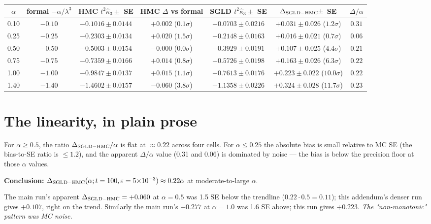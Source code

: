 \documentclass[11pt]{article}
\begin{document}
\begin{center}\small
\begin{tabular}{ccccccc}
\toprule
$\alpha$ & formal $-\alpha/\lambda^3$ &
  HMC $t^2 \hat\kappa_3 \pm$ SE & HMC $\Delta$ vs formal &
  SGLD $t^2 \hat\kappa_3 \pm$ SE & $\Delta_{\rm SGLD-HMC} \pm$ SE &
  $\Delta / \alpha$ \\
\midrule
0.10 & $-0.10$ & $-0.1016 \pm 0.0144$ & $+0.002$ ($0.1\sigma$) &
       $-0.0703 \pm 0.0216$ & $+0.031 \pm 0.026$ ($1.2\sigma$) & $0.31$ \\
0.25 & $-0.25$ & $-0.2303 \pm 0.0134$ & $+0.020$ ($1.5\sigma$) &
       $-0.2148 \pm 0.0163$ & $+0.016 \pm 0.021$ ($0.7\sigma$) & $0.06$ \\
0.50 & $-0.50$ & $-0.5003 \pm 0.0154$ & $-0.000$ ($0.0\sigma$) &
       $-0.3929 \pm 0.0191$ & $+0.107 \pm 0.025$ ($4.4\sigma$) & $0.21$ \\
0.75 & $-0.75$ & $-0.7359 \pm 0.0166$ & $+0.014$ ($0.8\sigma$) &
       $-0.5726 \pm 0.0198$ & $+0.163 \pm 0.026$ ($6.3\sigma$) & $0.22$ \\
1.00 & $-1.00$ & $-0.9847 \pm 0.0137$ & $+0.015$ ($1.1\sigma$) &
       $-0.7613 \pm 0.0176$ & $+0.223 \pm 0.022$ ($10.0\sigma$) & $0.22$ \\
1.40 & $-1.40$ & $-1.4602 \pm 0.0157$ & $-0.060$ ($3.8\sigma$) &
       $-1.1358 \pm 0.0226$ & $+0.324 \pm 0.028$ ($11.7\sigma$) & $0.23$ \\
\bottomrule
\end{tabular}
\end{center}

\section{The linearity, in plain prose}

For $\alpha \geq 0.5$, the ratio $\Delta_{\rm SGLD-HMC} / \alpha$ is
flat at $\approx 0.22$ across four cells. For $\alpha \leq 0.25$ the
absolute bias is small relative to MC SE (the bias-to-SE ratio is
$\leq 1.2$), and the apparent $\Delta / \alpha$ value (0.31 and 0.06)
is dominated by noise --- the bias is below the precision floor at
those $\alpha$ values.

\textbf{Conclusion: $\Delta_{\rm SGLD-HMC}(\alpha; t = 100, \varepsilon = 5{\times}10^{-3})
\approx 0.22 \alpha$} at moderate-to-large $\alpha$.

The main run's apparent $\Delta_{\rm SGLD-HMC} = +0.060$ at $\alpha = 0.5$
was 1.5 SE below the trendline ($0.22 \cdot 0.5 = 0.11$); this addendum's
denser run gives $+0.107$, right on the trend. Similarly the main run's
$+0.277$ at $\alpha = 1.0$ was 1.6 SE above; this run gives $+0.223$.
\emph{The "non-monotonic" pattern was MC noise.}
\end{document}
